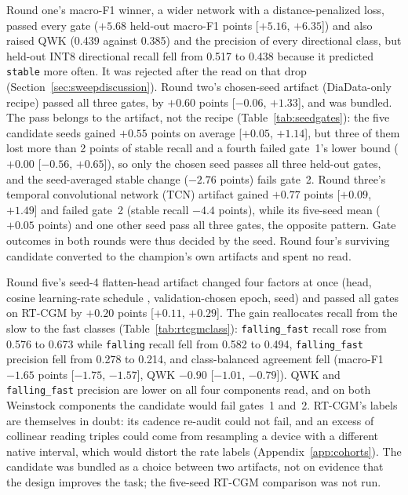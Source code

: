 \documentclass[10pt,twocolumn]{article}
\begin{document}
Round one's macro-F1 winner, a wider network with a distance-penalized
loss, passed every gate ($+5.68$ held-out macro-F1 points
[$+5.16$, $+6.35$]) and also raised QWK (0.439 against 0.385) and the
precision of every directional class, but held-out INT8 directional recall
fell from 0.517 to 0.438 because it predicted \texttt{stable} more often.
It was rejected after the read on that drop (Section~\ref{sec:sweepdiscussion}).
Round two's chosen-seed artifact (DiaData-only recipe) passed all three
gates, by $+0.60$ points [$-0.06$, $+1.33$], and was bundled. The pass
belongs to the artifact, not the recipe (Table~\ref{tab:seedgates}): the
five candidate seeds gained $+0.55$ points on average [$+0.05$, $+1.14$],
but three of them lost more than 2 points of stable recall and a fourth
failed gate~1's lower bound ($+0.00$ [$-0.56$, $+0.65$]), so only the
chosen seed passes all three held-out gates, and the seed-averaged stable change ($-2.76$ points) fails gate~2.
Round three's temporal convolutional network (TCN) artifact gained
$+0.77$ points [$+0.09$, $+1.49$] and failed gate~2 (stable recall
$-4.4$ points), while its five-seed mean ($+0.05$ points) and one other
seed pass all three gates, the opposite pattern. Gate outcomes in both rounds were thus decided by the seed.
Round four's surviving candidate converted to the champion's own
artifacts and spent no read.

Round five's seed-4 flatten-head artifact changed four factors at once
(head, cosine learning-rate schedule \cite{loshchilov2017sgdr},
validation-chosen epoch, seed) and passed all gates on RT-CGM by $+0.20$
points [$+0.11$, $+0.29$]. The gain reallocates recall from the slow to
the fast classes (Table~\ref{tab:rtcgmclass}): \texttt{falling\_fast}
recall rose from 0.576 to 0.673 while \texttt{falling} recall fell from
0.582 to 0.494, \texttt{falling\_fast} precision fell from 0.278 to 0.214,
and class-balanced agreement fell (macro-F1 $-1.65$ points
[$-1.75$, $-1.57$], QWK $-0.90$ [$-1.01$, $-0.79$]). QWK and
\texttt{falling\_fast} precision are lower on all four components read,
and on both Weinstock components the candidate would fail gates~1 and~2.
RT-CGM's labels are themselves in doubt: its cadence re-audit could not
fail, and an excess of collinear reading triples could come from
resampling a device with a different native interval, which would distort
the rate labels (Appendix~\ref{app:cohorts}). The candidate was bundled as
a choice between two artifacts, not on evidence that the design improves
the task; the five-seed RT-CGM comparison was not run.
\end{document}
